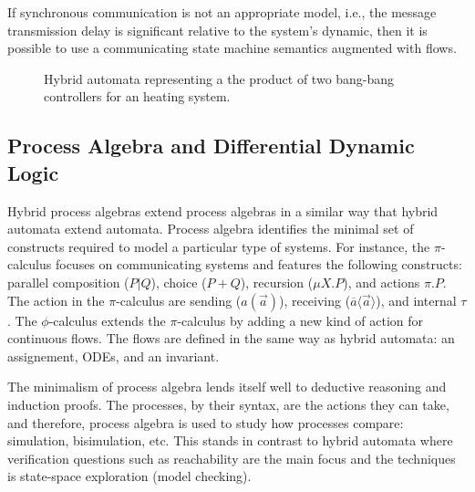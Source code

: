 \documentclass[
graybox,
envcountchap
]{svmult}
\begin{document}
\begin{bibunit}
If synchronous communication is not an appropriate model, i.e., the message transmission delay is significant relative to the system's dynamic, then it is possible to use a communicating state machine semantics \cite{DBLP:journals/jacm/BrandZ83} augmented with flows.

\begin{figure}
\centering
\resizebox{.8\linewidth}{!}{
    
}
\caption{
    Hybrid automata representing a the product of two bang-bang controllers for an heating system.
}
\label{fig:HA-ex2}
\end{figure}

    \subsection{Process Algebra and Differential Dynamic Logic}

Hybrid process algebras \cite{RoundsS03,BERGSTRA2005215,10.1007/978-3-319-53733-7_8,DBLP:conf/case/CampbellTLPOF16} extend process algebras in a similar way that hybrid automata extend automata.
Process algebra identifies the minimal set of constructs required to model a particular type of systems.
For instance, the $\pi$-calculus \cite{short:MilnerR:calmp1} focuses on communicating systems and features the following constructs:
  parallel composition ($P | Q$),
  choice ($P + Q$),
  recursion ($\mu X. P$), and
  actions $\pi.P$.
The action in the $\pi$-calculus are sending ($a(\vec a)$), receiving ($\overline{a}\langle \vec a \rangle$), and internal $\tau$. 
The $\phi$-calculus \cite{RoundsS03} extends the $\pi$-calculus by adding a new kind of action for continuous flows.
The flows are defined in the same way as hybrid automata: an assignement, ODEs, and an invariant.

The minimalism of process algebra lends itself well to deductive reasoning and induction proofs.
The processes, by their syntax, are the actions they can take, and therefore, process algebra is used to study how processes compare: simulation, bisimulation, etc.
This stands in contrast to hybrid automata where verification questions such as reachability are the main focus and the techniques is state-space exploration (model checking).


\end{bibunit}
\end{document}
